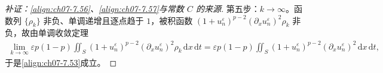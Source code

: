 ﻿\documentclass[../../main.tex]{subfiles}%
\begin{document}
\begin{proof}[补证：\eqref{align:ch07-7.56}、\eqref{align:ch07-7.57}与常数 $C$ 的来源]
第五步：$k\to\infty$。函数列 $\{\rho_k\}$ 非负、单调递增且逐点趋于 $1$，被积函数 $(1+u_n^\varepsilon)^{p-2}(\partial_xu_n^\varepsilon)^2\rho_k$ 非负，故由单调收敛定理
\begin{align*}
\lim_{k\to\infty}\varepsilon p(1-p)\iint_S(1+u_n^\varepsilon)^{p-2}(\partial_xu_n^\varepsilon)^2\rho_k\,\mathrm{d}x\,\mathrm{d}t
=\varepsilon p(1-p)\iint_S(1+u_n^\varepsilon)^{p-2}(\partial_xu_n^\varepsilon)^2\,\mathrm{d}x\,\mathrm{d}t,
\end{align*}
于是\eqref{align:ch07-7.53}成立。
\end{proof}

\end{document}
